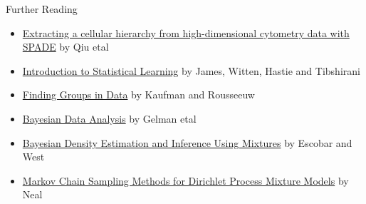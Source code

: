 \documentclass{beamer}
\begin{document}
	\begin{frame}{Further Reading}
		\begin{itemize}
			\item \href{https://www.nature.com/articles/nbt.1991}{Extracting a cellular hierarchy from high-dimensional
			cytometry data with SPADE} by Qiu etal
			\item \href{https://www.statlearning.com/}{Introduction to Statistical Learning} by James, Witten, Hastie and Tibshirani
			\item \href{https://onlinelibrary.wiley.com/doi/book/10.1002/9780470316801}{Finding Groups in Data} by Kaufman and Rousseeuw
			\item \href{http://www.stat.columbia.edu/~gelman/book/}{Bayesian Data Analysis} by Gelman etal
			\item \href{https://www.jstor.org/stable/2291069?seq=1}{Bayesian Density Estimation and Inference Using Mixtures} by Escobar and West
			\item \href{https://www.jstor.org/stable/1390653?seq=1}{Markov Chain Sampling Methods for Dirichlet Process Mixture Models} by Neal
		\end{itemize}
	\end{frame}
\end{document}
